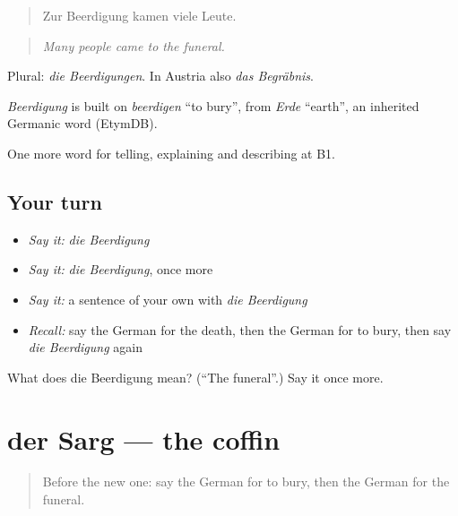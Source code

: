\begin{quote}
Zur Beerdigung kamen viele Leute.
\end{quote}

\begin{quote}
\emph{Many people came to the funeral.}
\end{quote}

Plural: \emph{die Beerdigungen}. In Austria also \emph{das Begräbnis}.

\begin{cousinweb}
\emph{Beerdigung} is built on \emph{beerdigen} \textquotedblleft{}to bury\textquotedblright{}, from \emph{Erde} \textquotedblleft{}earth\textquotedblright{}, an inherited Germanic word (EtymDB).
\end{cousinweb}

\begin{grammarlens}[title={What you've built}]
One more word for telling, explaining and describing at B1.
\end{grammarlens}

\subsection*{Your turn}
\begin{itemize}
\raggedright
  \item \emph{Say it:} \emph{die Beerdigung}
  \item \emph{Say it:} \emph{die Beerdigung}, once more
  \item \emph{Say it:} a sentence of your own with \emph{die Beerdigung}
  \item \emph{Recall:} say the German for the death, then the German for to bury, then say \emph{die Beerdigung} again
\end{itemize}

\begin{tcolorbox}[breakable,colback=teal!4,colframe=teal!35!black,title={Before you move on}]
What does die Beerdigung mean? (\textquotedblleft{}The funeral\textquotedblright{}.) Say it once more.
\end{tcolorbox}
\section[der Sarg]{der Sarg — the coffin}

\label{lesson:GE-C303-sarg}



\begin{quote}
Before the new one: say the German for to bury, then the German for the funeral.
\end{quote}

